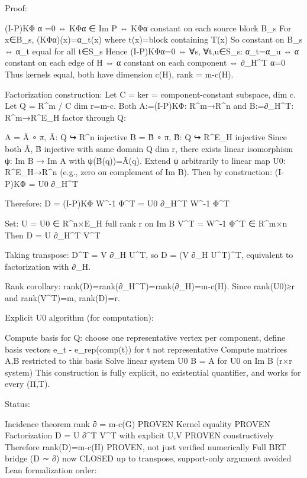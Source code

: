 Proof:

(I-P)KΦ α =0 ⇔ KΦα ∈ Im P ⇔ KΦα constant on each source block B_s
For x∈B_s, (KΦα)(x)=α_{t(x)} where t(x)=block containing T(x)
So constant on B_s ⇔ α_t equal for all t∈S_s
Hence (I-P)KΦα=0 ⇔ ∀s, ∀t,u∈S_s: α_t=α_u ⇔ α constant on each edge of H ⇔ α constant on each component ⇔ ∂_H^T α=0
Thus kernels equal, both have dimension c(H), rank = m-c(H).

Factorization construction:
Let C = ker = component-constant subspace, dim c. Let Q = R^m / C dim r=m-c.
Both A:=(I-P)KΦ: R^m→R^n and B:=∂_H^T: R^m→R^{E_H} factor through Q:

A = Ã ∘ π, Ã: Q ↪ R^n injective
B = B̃ ∘ π, B̃: Q ↪ R^{E_H} injective
Since both Ã, B̃ injective with same domain Q dim r, there exists linear isomorphism ψ: Im B → Im A with ψ(B̃(q))=Ã(q). Extend ψ arbitrarily to linear map U0: R^{E_H}→R^n (e.g., zero on complement of Im B).
Then by construction:
(I-P)KΦ = U0 ∂_H^T

Therefore:
D = (I-P)KΦ W^{-1} Φ^T = U0 ∂_H^T W^{-1} Φ^T

Set:
U = U0 ∈ R^{n×E_H} full rank r on Im B
V^T = W^{-1} Φ^T ∈ R^{m×n}
Then D = U ∂_H^T V^T

Taking transpose: D^T = V ∂_H U^T, so D = (V ∂_H U^T)^T, equivalent to factorization with ∂_H.

Rank corollary: rank(D)=rank(∂_H^T)=rank(∂_H)=m-c(H). Since rank(U0)≥r and rank(V^T)=m, rank(D)=r.

Explicit U0 algorithm (for computation):

Compute basis for Q: choose one representative vertex per component, define basis vectors e_t - e_rep(comp(t)) for t not representative
Compute matrices A,B restricted to this basis
Solve linear system U0 B = A for U0 on Im B (r×r system)
This construction is fully explicit, no existential quantifier, and works for every (Π,T).

Status:

Incidence theorem rank ∂ = m-c(G) PROVEN
Kernel equality PROVEN
Factorization D = U ∂^T V^T with explicit U,V PROVEN constructively
Therefore rank(D)=m-c(H) PROVEN, not just verified numerically
Full BRT bridge (D ∼ ∂) now CLOSED up to transpose, support-only argument avoided
Lean formalization order:

